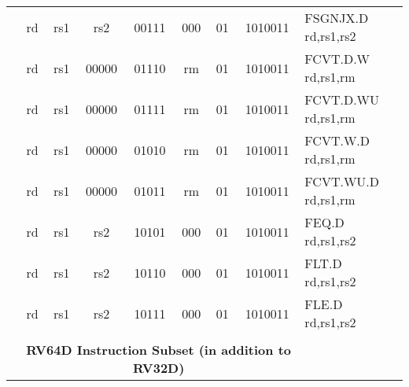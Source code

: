 \begin{table}[p]
\begin{small}
\begin{center}
\begin{tabular}{rccccccccccl}
&
\multicolumn{1}{|c|}{rd} &
\multicolumn{1}{c|}{rs1} &
\multicolumn{1}{c|}{rs2} &
\multicolumn{3}{c|}{00111} &
\multicolumn{2}{c|}{000} &
\multicolumn{1}{c|}{01} &
\multicolumn{1}{c|}{1010011} & FSGNJX.D rd,rs1,rs2 \\
\cline{2-11}
  

&
\multicolumn{1}{|c|}{rd} &
\multicolumn{1}{c|}{rs1} &
\multicolumn{1}{c|}{00000} &
\multicolumn{3}{c|}{01110} &
\multicolumn{2}{c|}{rm} &
\multicolumn{1}{c|}{01} &
\multicolumn{1}{c|}{1010011} & FCVT.D.W rd,rs1,rm \\
\cline{2-11}
  

&
\multicolumn{1}{|c|}{rd} &
\multicolumn{1}{c|}{rs1} &
\multicolumn{1}{c|}{00000} &
\multicolumn{3}{c|}{01111} &
\multicolumn{2}{c|}{rm} &
\multicolumn{1}{c|}{01} &
\multicolumn{1}{c|}{1010011} & FCVT.D.WU rd,rs1,rm \\
\cline{2-11}
  

&
\multicolumn{1}{|c|}{rd} &
\multicolumn{1}{c|}{rs1} &
\multicolumn{1}{c|}{00000} &
\multicolumn{3}{c|}{01010} &
\multicolumn{2}{c|}{rm} &
\multicolumn{1}{c|}{01} &
\multicolumn{1}{c|}{1010011} & FCVT.W.D rd,rs1,rm \\
\cline{2-11}
  

&
\multicolumn{1}{|c|}{rd} &
\multicolumn{1}{c|}{rs1} &
\multicolumn{1}{c|}{00000} &
\multicolumn{3}{c|}{01011} &
\multicolumn{2}{c|}{rm} &
\multicolumn{1}{c|}{01} &
\multicolumn{1}{c|}{1010011} & FCVT.WU.D rd,rs1,rm \\
\cline{2-11}
  

&
\multicolumn{1}{|c|}{rd} &
\multicolumn{1}{c|}{rs1} &
\multicolumn{1}{c|}{rs2} &
\multicolumn{3}{c|}{10101} &
\multicolumn{2}{c|}{000} &
\multicolumn{1}{c|}{01} &
\multicolumn{1}{c|}{1010011} & FEQ.D rd,rs1,rs2 \\
\cline{2-11}
  

&
\multicolumn{1}{|c|}{rd} &
\multicolumn{1}{c|}{rs1} &
\multicolumn{1}{c|}{rs2} &
\multicolumn{3}{c|}{10110} &
\multicolumn{2}{c|}{000} &
\multicolumn{1}{c|}{01} &
\multicolumn{1}{c|}{1010011} & FLT.D rd,rs1,rs2 \\
\cline{2-11}
  

&
\multicolumn{1}{|c|}{rd} &
\multicolumn{1}{c|}{rs1} &
\multicolumn{1}{c|}{rs2} &
\multicolumn{3}{c|}{10111} &
\multicolumn{2}{c|}{000} &
\multicolumn{1}{c|}{01} &
\multicolumn{1}{c|}{1010011} & FLE.D rd,rs1,rs2 \\
\cline{2-11}
  

&
\multicolumn{10}{c}{} & \\
&
\multicolumn{10}{c}{\bf RV64D Instruction Subset (in addition to RV32D)} & \\
\cline{2-11}
  


\end{tabular}
\end{center}
\end{small}
\end{table}
